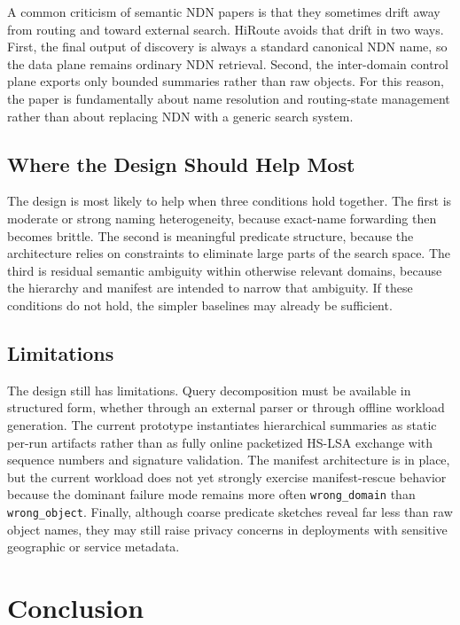 \documentclass[journal]{IEEEtran}
\newcommand{\sysname}{HiRoute}
\newcommand{\hslsa}{HS-LSA}
\begin{document}
A common criticism of semantic NDN papers is that they sometimes drift away from routing and toward external search. \sysname{} avoids that drift in two ways. First, the final output of discovery is always a standard canonical NDN name, so the data plane remains ordinary NDN retrieval. Second, the inter-domain control plane exports only bounded summaries rather than raw objects. For this reason, the paper is fundamentally about name resolution and routing-state management rather than about replacing NDN with a generic search system.

\subsection{Where the Design Should Help Most}

The design is most likely to help when three conditions hold together. The first is moderate or strong naming heterogeneity, because exact-name forwarding then becomes brittle. The second is meaningful predicate structure, because the architecture relies on constraints to eliminate large parts of the search space. The third is residual semantic ambiguity within otherwise relevant domains, because the hierarchy and manifest are intended to narrow that ambiguity. If these conditions do not hold, the simpler baselines may already be sufficient.

\subsection{Limitations}

The design still has limitations. Query decomposition must be available in structured form, whether through an external parser or through offline workload generation. The current prototype instantiates hierarchical summaries as static per-run artifacts rather than as fully online packetized \hslsa{} exchange with sequence numbers and signature validation. The manifest architecture is in place, but the current workload does not yet strongly exercise manifest-rescue behavior because the dominant failure mode remains more often \texttt{wrong\_domain} than \texttt{wrong\_object}. Finally, although coarse predicate sketches reveal far less than raw object names, they may still raise privacy concerns in deployments with sensitive geographic or service metadata.

\section{Conclusion}
\end{document}
